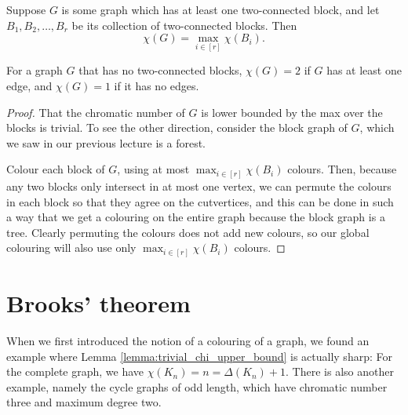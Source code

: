\documentclass[nobib]{tufte-handout}
\begin{document}
\begin{lemma}\label{lemma:chi_max_over_biconnecteds}
  Suppose $G$ is some graph which has at least one two-connected block, and let $B_1, B_2, \ldots, B_r$ be its collection of two-connected blocks. Then
  $$\chi(G) = \max_{i\in[r]} \chi(B_i).$$

  For a graph $G$ that has no two-connected blocks, $\chi(G) = 2$ if $G$ has at least one edge, and $\chi(G) = 1$ if it has no edges.

  \begin{proof}
    That the chromatic number of $G$ is lower bounded by the max over the blocks is trivial. To see the other direction, consider the block graph of $G$, which we saw in our previous lecture is a forest.

    Colour each block of $G$, using at most $\max_{i\in[r]} \chi(B_i)$ colours. Then, because any two blocks only intersect in at most one vertex, we can permute the colours in each block so that they agree on the cutvertices, and this can be done in such a way that we get a colouring on the entire graph because the block graph is a tree. Clearly permuting the colours does not add new colours, so our global colouring will also use only $\max_{i\in[r]} \chi(B_i)$ colours.
  \end{proof}
\end{lemma}

\section{Brooks' theorem}

When we first introduced the notion of a colouring of a graph, we found an example where Lemma \ref{lemma:trivial_chi_upper_bound} is actually sharp: For the complete graph, we have $\chi(K_n) = n = \Delta(K_n) + 1$. There is also another example, namely the cycle graphs of odd length, which have chromatic number three and maximum degree two.
\end{document}
